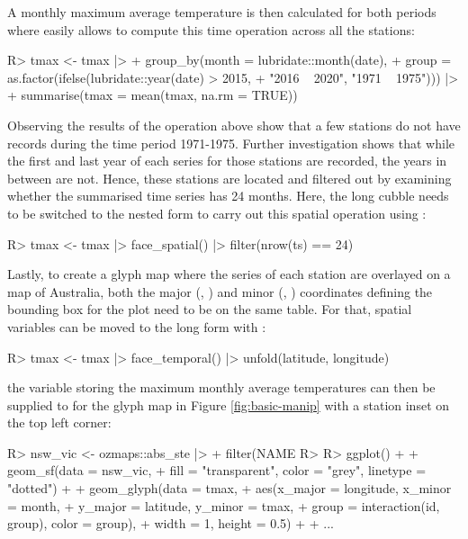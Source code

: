 \documentclass[
]{jss}
\begin{document}
A monthly maximum average temperature is then calculated for both periods where  easily allows to compute this time operation across all the stations:

\begin{CodeChunk}
\begin{CodeInput}
R> tmax <- tmax |>
+   group_by(month = lubridate::month(date),
+          group = as.factor(ifelse(lubridate::year(date) > 2015,
+                                   "2016 ~ 2020", "1971 ~ 1975"))) |>
+   summarise(tmax = mean(tmax, na.rm = TRUE))
\end{CodeInput}
\end{CodeChunk}

Observing the results of the operation above show that a few stations do not have records during the time period 1971-1975. Further investigation shows that while the first and last year of each series for those stations are recorded, the years in between are not. Hence, these stations are located and filtered out by examining whether the summarised time series has 24 months. Here, the long cubble needs to be switched to the nested form to carry out this spatial operation using :

\begin{CodeChunk}
\begin{CodeInput}
R> tmax <- tmax |> face_spatial() |> filter(nrow(ts) == 24)
\end{CodeInput}
\end{CodeChunk}

Lastly, to create a glyph map where the series of each station are overlayed on a map of Australia, both the major (, ) and minor (, ) coordinates defining the bounding box for the plot need to be on the same table. For that, spatial variables can be moved to the long form with :

\begin{CodeChunk}
\begin{CodeInput}
R> tmax <- tmax |> face_temporal() |> unfold(latitude, longitude)
\end{CodeInput}
\end{CodeChunk}

the variable storing the maximum monthly average temperatures  can then be supplied to  for the glyph map in Figure \ref{fig:basic-manip} with a station inset on the top left corner:

\begin{CodeChunk}
\begin{CodeInput}
R> nsw_vic <- ozmaps::abs_ste |>
+   filter(NAME %
R> 
R> ggplot() +
+   geom_sf(data = nsw_vic,
+           fill = "transparent", color = "grey", linetype = "dotted") +
+   geom_glyph(data = tmax,
+              aes(x_major = longitude, x_minor = month,
+                  y_major = latitude, y_minor = tmax,
+                  group = interaction(id, group), color = group),
+              width = 1, height = 0.5) +
+   ...
\end{CodeInput}
\end{CodeChunk}
\end{document}
